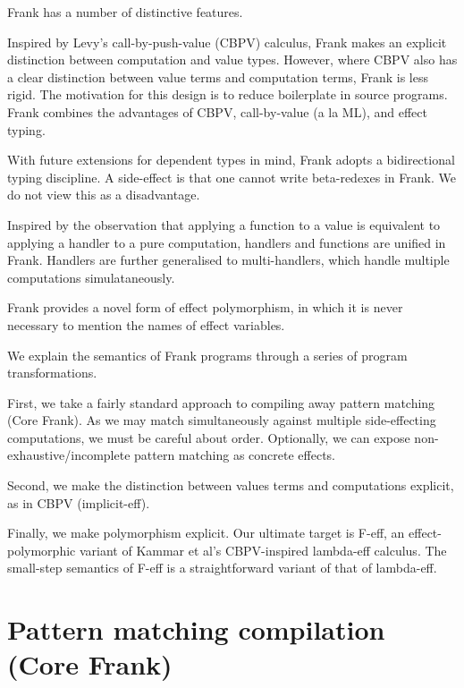 \documentclass[preprint]{sigplanconf}
\begin{document}
Frank has a number of distinctive features.

Inspired by Levy's call-by-push-value (CBPV) calculus, Frank makes an
explicit distinction between computation and value types. However,
where CBPV also has a clear distinction between value terms and
computation terms, Frank is less rigid. The motivation for this design
is to reduce boilerplate in source programs. Frank combines the
advantages of CBPV, call-by-value (a la ML), and effect typing.

With future extensions for dependent types in mind, Frank adopts a
bidirectional typing discipline. A side-effect is that one cannot
write beta-redexes in Frank. We do not view this as a disadvantage.

Inspired by the observation that applying a function to a value is
equivalent to applying a handler to a pure computation, handlers and
functions are unified in Frank. Handlers are further generalised to
multi-handlers, which handle multiple computations simulataneously.

Frank provides a novel form of effect polymorphism, in which it is
never necessary to mention the names of effect variables.

We explain the semantics of Frank programs through a series of program
transformations.

First, we take a fairly standard approach to compiling away pattern
matching (Core Frank). As we may match simultaneously against multiple
side-effecting computations, we must be careful about
order. Optionally, we can expose non-exhaustive/incomplete pattern
matching as concrete effects.

Second, we make the distinction between values terms and computations
explicit, as in CBPV (implicit-eff).

Finally, we make polymorphism explicit. Our ultimate target is F-eff,
an effect-polymorphic variant of Kammar et al's CBPV-inspired
lambda-eff calculus. The small-step semantics of F-eff is a
straightforward variant of that of lambda-eff.






\section{Pattern matching compilation (Core Frank)}

\end{document}
